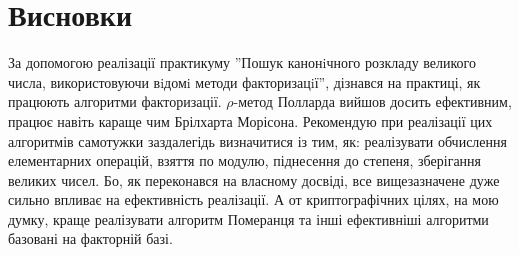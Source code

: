 \section{Висновки}
За допомогою реалізації практикуму ''Пошук канонiчного розкладу великого числа,
використовуючи вiдомi методи факторизацiї'', дізнався на практиці, як працюють алгоритми факторизації. $\rho$-метод Полларда вийшов досить ефективним, працює навіть караще чим Брілхарта Морісона. Рекомендую при реалізації цих алгоритмів самотужки заздалегідь визначитися із тим, як: реалізувати обчислення елементарних операцій, взяття по модулю, піднесення до степеня, зберігання великих чисел. Бо, як переконався на власному досвіді, все вищезазначене дуже сильно впливає на ефективність реалізації.
А от криптографічних цілях, на мою думку, краще реалізувати алгоритм Померанця та інші ефективніші алгоритми базовані на факторній базі.

		

	




